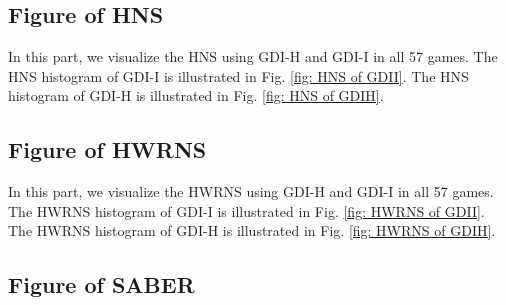 \documentclass[nohyperref]{article}
\theoremstyle{plain}
\begin{document}
\normalsize
\clearpage


\subsection{Figure of HNS}
\label{app: Figure of HNS}
In this part, we  visualize the HNS using GDI-H and  GDI-I in all 57 games. The HNS histogram of GDI-I is illustrated in Fig. \ref{fig: HNS of GDII}. The HNS histogram of GDI-H is illustrated in Fig. \ref{fig: HNS of GDIH}. 

\begin{figure*}[!ht]
	\caption{HNS (\%) of Atari 57 games using GDI-I.}
	\label{fig: HNS of GDII}
\end{figure*}


\begin{figure*}[!ht]
	\caption{HNS (\%) of Atari 57 games using GDI-H.}
	\label{fig: HNS of GDIH}
\end{figure*}

\clearpage

\subsection{Figure of HWRNS}
\label{app: Figure of HWRNS}
In this part, we  visualize the HWRNS \citep{dreamerv2,atarihuman} using GDI-H and  GDI-I in all 57 games. The HWRNS histogram of GDI-I is illustrated in Fig. \ref{fig: HWRNS of GDII}. The HWRNS histogram of GDI-H is illustrated in Fig. \ref{fig: HWRNS of GDIH}.

\begin{figure*}[!ht]
	\caption{HWRNS (\%) of Atari 57 games using GDI-I.}
	\label{fig: HWRNS of GDII}
\end{figure*}

\begin{figure*}[!ht]
	\caption{HWRNS (\%) of Atari 57 games using GDI-H.}
	\label{fig: HWRNS of GDIH}
\end{figure*}

\clearpage


\subsection{Figure of SABER}
\label{app: Figure of SABER}
\end{document}
